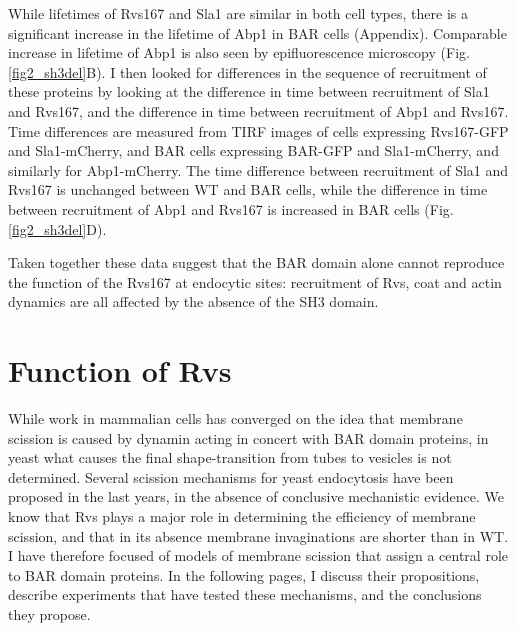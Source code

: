 \vspace{5mm}
\newpage
While lifetimes of Rvs167 and Sla1 are similar in both cell types, there is a significant increase in the lifetime of Abp1 in BAR cells (Appendix). Comparable increase in lifetime of Abp1 is also seen by epifluorescence microscopy (Fig.\ref{fig2_sh3del}B). I then looked for differences in the sequence of recruitment of these proteins by looking at the difference in time between recruitment of Sla1 and Rvs167, and the difference in time between recruitment of Abp1 and Rvs167. Time differences are measured from TIRF images of cells expressing  Rvs167-GFP and Sla1-mCherry, and BAR cells expressing BAR-GFP and Sla1-mCherry, and similarly for Abp1-mCherry. The time difference between recruitment of Sla1 and Rvs167 is unchanged between WT and BAR cells, while the difference in time between recruitment of Abp1 and Rvs167 is increased in BAR cells  (Fig.\ref{fig2_sh3del}D).

	\vspace{5mm}
Taken together these data suggest that the BAR domain alone cannot reproduce the function of the Rvs167 at endocytic sites: recruitment of Rvs, coat and actin dynamics are all affected by the absence of the SH3 domain. 

\newpage
		
\section{Function of Rvs}
\label{scisson_models}

While work in mammalian cells has converged on the idea that membrane scission is caused by dynamin acting in concert with BAR domain proteins, in yeast what causes the final shape-transition from tubes to vesicles is not determined. Several scission mechanisms for yeast endocytosis have been proposed in the last years, in the absence of conclusive mechanistic evidence. We know that Rvs plays a major role in determining the efficiency of membrane scission, and that in its absence membrane invaginations are shorter than in WT. I have therefore focused of models of membrane scission that assign a central role to BAR domain proteins. In the following pages, I discuss their propositions, describe experiments that have tested these mechanisms, and the conclusions they propose. 


